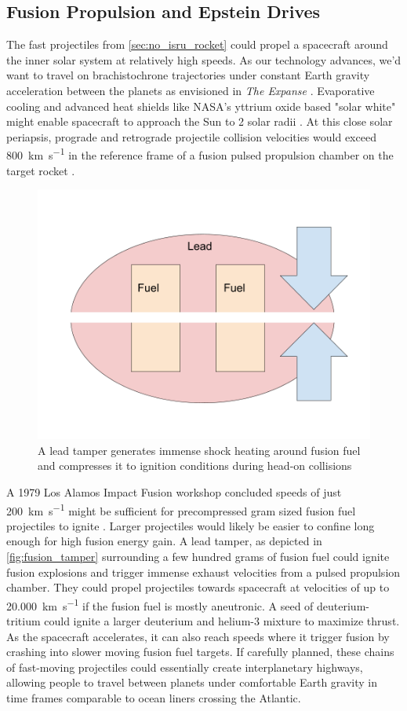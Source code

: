 \documentclass{article}
\begin{document}
\subsection{Fusion Propulsion and Epstein Drives}\label{sec:epstein_drives}
The fast projectiles from \autoref{sec:no_isru_rocket} could propel a spacecraft around the inner solar system at relatively high speeds.   As our technology advances, we'd want to travel on brachistochrone trajectories under constant Earth gravity acceleration between the planets as envisioned in \textit{The Expanse} \cite{Corey2012Drive}.  Evaporative cooling and advanced heat shields like NASA's yttrium oxide based "solar white" might  enable spacecraft to approach the Sun to 2 solar radii \cite{ted_ed_2025_how_close}.  At this close solar periapsis, prograde and retrograde projectile collision velocities would exceed \SI{800}{\kilo\meter\per\second} in the reference frame of a fusion pulsed propulsion chamber on the target rocket \cite{ted_ed_2025_how_close}.  

\begin{figure}[htpb]
    \centering
    \includegraphics[width=0.5\linewidth]{images/Fusion Impactors.png}
    \caption{A lead tamper generates immense shock heating around fusion fuel and compresses it to ignition conditions during head-on collisions}
    \label{fig:fusion_tamper}
\end{figure}

A 1979 Los Alamos Impact Fusion workshop concluded speeds of just \SI{200}{\kilo\meter\per\second} might be sufficient for precompressed gram sized fusion fuel projectiles to ignite \cite{impactfusion1979}.   Larger projectiles would likely be easier to confine long enough for high fusion energy gain.   A lead tamper, as depicted in \autoref{fig:fusion_tamper} surrounding a few hundred grams of fusion fuel could ignite fusion explosions and trigger immense exhaust velocities from a pulsed propulsion chamber.  
They could propel projectiles towards spacecraft at velocities of up to \SI{20,000}{\kilo\meter\per\second} if the fusion fuel is mostly aneutronic.   A seed of deuterium-tritium could ignite a larger deuterium and helium-3 mixture to maximize thrust.   As the spacecraft accelerates, it can also reach speeds where it trigger fusion by crashing into slower moving fusion fuel targets.   If carefully planned, these chains of fast-moving projectiles could essentially create interplanetary highways, allowing people to travel between planets under comfortable Earth gravity in time frames comparable to ocean liners crossing the Atlantic. 
\end{document}
